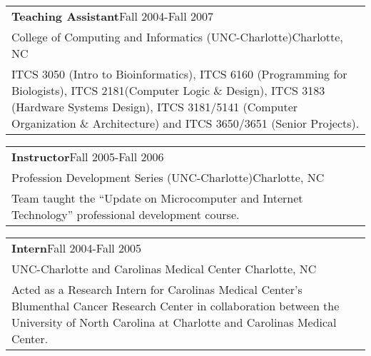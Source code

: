\documentclass[12pt]{report}
\def\fullLength{6.5in}
\begin{document}
\begin{table}[!h]
\begin{tabular}{p{\fullLength}}
\textbf{Teaching Assistant}\hfill Fall 2004-Fall 2007\\
College of Computing and Informatics (UNC-Charlotte)\hfill Charlotte, NC\\
ITCS 3050 (Intro to Bioinformatics), ITCS 6160 (Programming for Biologists), ITCS 2181(Computer Logic \& Design), ITCS 3183 (Hardware Systems Design), ITCS 3181/5141 (Computer Organization \& Architecture) and ITCS 3650/3651 (Senior Projects).\\
\end{tabular}
\end{table}

\begin{table}[!h]
\begin{tabular}{p{\fullLength}}
\textbf{Instructor}\hfill Fall 2005-Fall 2006\\
Profession Development Series (UNC-Charlotte)\hfill Charlotte, NC\\
Team taught the ``Update on Microcomputer and Internet Technology'' professional development course.\\
\end{tabular}
\end{table}

\begin{table}[!h]
\begin{tabular}{p{\fullLength}}
\textbf{Intern}\hfill Fall 2004-Fall 2005\\
UNC-Charlotte and Carolinas Medical Center \hfill Charlotte, NC\\
Acted as a Research Intern for Carolinas Medical Center’s Blumenthal Cancer Research Center in collaboration between the University of North Carolina at Charlotte and Carolinas Medical Center.
\end{tabular}
\end{table}

\clearpage
\end{document}
